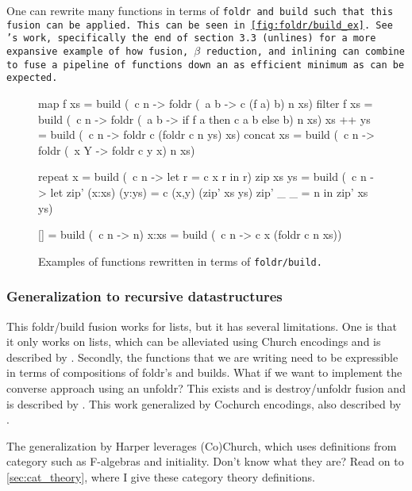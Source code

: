 One can rewrite many functions in terms of \tt{foldr} and \tt{build} such that this fusion can be applied. This can be seen in \autoref{fig:foldr/build_ex}.
See \cite{Gill1993}'s work, specifically the end of section 3.3 (\tt{unlines}) for a more expansive example of how fusion, $\beta$ reduction, and inlining can combine to fuse a pipeline of functions down an as efficient minimum as can be expected.
\begin{figure}[ht]
    \centering
    \begin{code}
map f xs    = build (\ c n -> foldr (\ a b -> c (f a) b) n xs)
filter f xs = build (\ c n -> foldr (\ a b -> if f a then c a b else b) n xs)
xs ++ ys    = build (\ c n -> foldr c (foldr c n ys) xs)
concat xs   = build (\ c n -> foldr (\ x Y -> foldr c y x) n xs)

repeat x    = build (\ c n -> let r = c x r in r)
zip xs ys   = build (\ c n -> let zip' (x:xs) (y:ys) = c (x,y) (zip' xs ys)
                                  zip' _      _      = n
                                  in zip' xs ys)

[]         = build (\ c n -> n)
x:xs       = build (\ c n -> c x (foldr c n xs))
    \end{code}
    \caption{Examples of functions rewritten in terms of \tt{foldr/build}. \citep{Gill1993}}
    \label{fig:foldr/build_ex}
\end{figure}



\subsubsection{Generalization to recursive datastructures}
This foldr/build fusion works for lists, but it has several limitations.
One is that it only works on lists, which can be alleviated using Church encodings and is described by \cite{Harper2011}.
Secondly, the functions that we are writing need to be expressible in terms of compositions of foldr's and builds. What if we want to implement the converse approach using an unfoldr?
This exists and is destroy/unfoldr fusion and is described by \cite{Coutts2007}.
This work generalized by Cochurch encodings, also described by \cite{Harper2011}.

The generalization by Harper leverages (Co)Church, which uses definitions from category such as F-algebras and initiality.
Don't know what they are? Read on to \autoref{sec:cat_theory}, where I give these category theory definitions.


